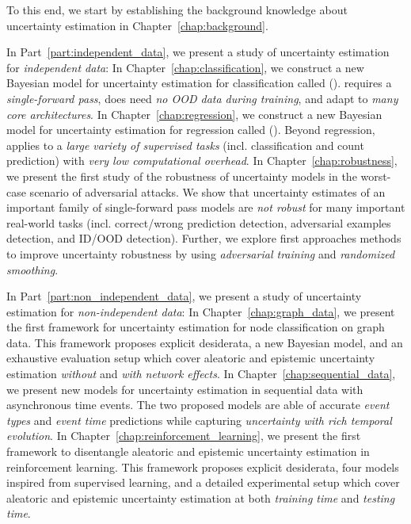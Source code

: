 To this end, we start by establishing the background knowledge about uncertainty estimation in Chapter~\ref{chap:background}.

In Part~\ref{part:independent_data}, we present a study of uncertainty estimation for \emph{independent data}: 
In Chapter~\ref{chap:classification}, we construct a new Bayesian model for uncertainty estimation for classification called \PostNet{} (\PostNetacro{}). \PostNetacro{} requires a \emph{single-forward pass}, does need \emph{no OOD data during training}, and adapt to \emph{many core architectures}.
In Chapter~\ref{chap:regression}, we construct a new Bayesian model for uncertainty estimation for regression called \NatPN{} (\NatPNacro{}). Beyond regression, \NatPNacro{} applies to a \emph{large variety of supervised tasks} (incl. classification and count prediction) with \emph{very low computational overhead}.
In Chapter~\ref{chap:robustness}, we present the first study of the robustness of uncertainty models in the worst-case scenario of adversarial attacks. We show that uncertainty estimates of an important family of single-forward pass models are \emph{not robust} for many important real-world tasks (incl. correct/wrong prediction detection, adversarial examples detection, and ID/OOD detection). Further, we explore first approaches methods to improve uncertainty robustness by using \emph{adversarial training} and \emph{randomized smoothing}. 

In Part~\ref{part:non_independent_data}, we present a study of uncertainty estimation for \emph{non-independent data}:
In Chapter~\ref{chap:graph_data}, we present the first framework for uncertainty estimation for node classification on graph data. This framework proposes explicit desiderata, a new Bayesian model, and an exhaustive evaluation setup which cover aleatoric and epistemic uncertainty estimation \emph{without} and \emph{with network effects}.
In Chapter~\ref{chap:sequential_data}, we present new models for uncertainty estimation in sequential data with asynchronous time events. The two proposed models are able of accurate \emph{event types} and \emph{event time} predictions while capturing \emph{uncertainty with rich temporal evolution}.
In Chapter~\ref{chap:reinforcement_learning}, we present the first framework to disentangle aleatoric and epistemic uncertainty estimation in reinforcement learning. This framework proposes explicit desiderata, four models inspired from supervised learning, and a detailed experimental setup which cover aleatoric and epistemic uncertainty estimation at both \emph{training time} and \emph{testing time}.

